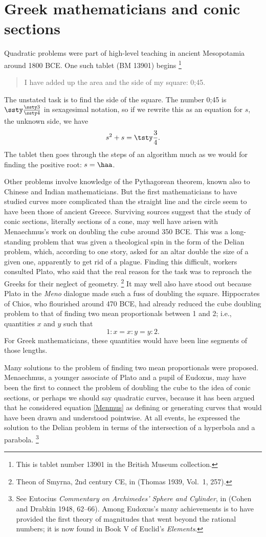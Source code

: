 \section{Greek mathematicians and conic sections}
Quadratic problems were part of high-level teaching in ancient Mesopotamia
around 1800 BCE. One such tablet (BM 13901) begins%
%
\footnote{This is
tablet number 13901 in the British Museum collection.}
\begin{quote}
I have added up the area and the side of my square: 0;45.
\end{quote}
The unstated task is to find the side of the square.
The number 0;45 is $\ssty\frac{\ssty3}{\ssty4}$ in sexagesimal notation,
so if we rewrite this as an equation for $s$, the unknown side, we have
$$s^2 + s = \tsty\frac{3}{4}.$$
The tablet then goes through the steps of an algorithm much as we would
for finding the positive root: $s = \haa$.

Other problems involve knowledge of the Pythagorean theorem, known also
to Chinese and Indian mathematicians. But the first mathematicians to
have studied curves more complicated than the straight line and the
circle seem to have been those of ancient Greece.  Surviving sources
suggest that the study of conic sections, literally sections of a cone,
may well have arisen with Menaechmus's work on doubling the cube around
350 BCE. This was a long-standing problem that was given a theological
spin in the form of the Delian problem, which, according to one story,
asked for an altar double the size of a given one, apparently to get
rid of a plague. Finding this difficult, workers consulted Plato, who
said that the real reason for the task was to reproach the Greeks for
their neglect of geometry.%
%
\footnote{Theon of Smyrna, 2nd century CE, in (Thomas 1939, Vol.\ 1, 257).}
%
It may well also have stood out because Plato in the \emph{Meno}
dialogue made such a fuss of doubling the square. Hippocrates of
Chios, who flourished around 470 BCE,  had already reduced the
cube doubling
problem to that of finding two mean proportionals between 1 and 2;
i.e., quantities $x$ and $y$ such that
\begin{equation}\label{Menmus}
1:x= x:y = y: 2.
\tag{$*$}
\end{equation}
For Greek mathematicians, these quantities would have been line segments
of those lengths.

Many solutions to the problem of finding two mean proportionals were
proposed.
Menaechmus, a younger associate of Plato and a pupil of Eudoxus, may
have been the first to connect the problem of doubling the cube to the
idea of conic sections, or perhaps we should say quadratic curves,
because it has been argued that he considered equation \eqref{Menmus}
as defining or generating curves that would have been drawn and
understood pointwise. At all events, he expressed the solution to the
Delian problem in terms of the intersection of a hyperbola and a
parabola.%
\footnote{See Eutocius \emph{Commentary on Archimedes' Sphere
  and Cylinder}, in (Cohen and Drabkin 1948, 62--66).
  Among Eudoxus's many achievements is to have provided the first
  theory of
  magnitudes that went beyond the rational numbers; it is now found in
  Book V of Euclid's \emph{Elements}.}

